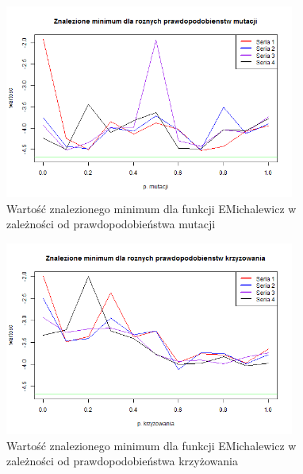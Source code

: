 \documentclass[11pt, a4paper]{article}
\begin{document}
\begin{figure}[H]
	\begin{center}
		\includegraphics[width=0.85\textwidth]{./assets/EMichalewicz2.png}
		\caption{Wartość znalezionego minimum dla funkcji EMichalewicz w zależności od prawdopodobieństwa mutacji}
		\label{fig:emichalewicz2}
	\end{center}
\end{figure}

\begin{figure}[H]
	\begin{center}
		\includegraphics[width=0.85\textwidth]{./assets/EMichalewicz3.png}
		\caption{Wartość znalezionego minimum dla funkcji EMichalewicz w zależności od prawdopodobieństwa krzyżowania}
		\label{fig:emichalewicz3}
	\end{center}
\end{figure}
\end{document}
